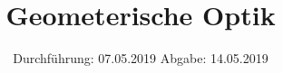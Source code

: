 

\subject{Nr. 408}
\title{Geometerische Optik}
\date{%
  Durchführung: 07.05.2019
  \hspace{3em}
  Abgabe: 14.05.2019
}



\maketitle
\thispagestyle{empty}
\tableofcontents
\newpage






\printbibliography{}


